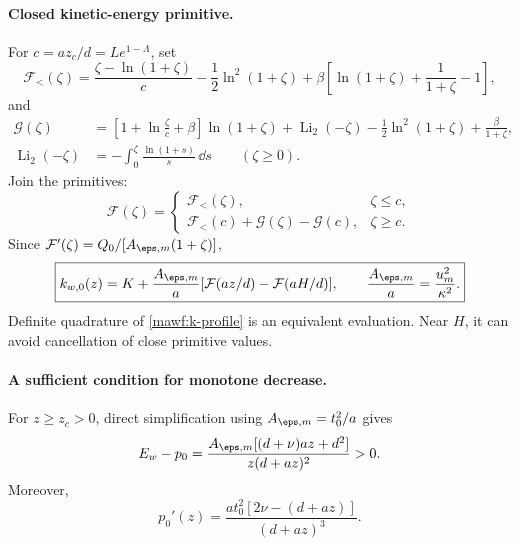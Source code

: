 \paragraph{Closed kinetic-energy primitive.}
For \(c=az_c/d=L e^{1-\Lambda}\), set
\begin{equation}
 \mathcal F_<(\zeta)=
 \frac{\zeta-\ln(1+\zeta)}c-\frac12\ln^2(1+\zeta)
 +\beta\left[\ln(1+\zeta)+\frac1{1+\zeta}-1\right],
\end{equation}
and
\begin{equation}
 \begin{split}
 \mathcal G(\zeta)
 &=\left[1+\ln\frac{\zeta}{c}+\beta\right]\ln(1+\zeta)
   +\operatorname{Li}_2(-\zeta)
   -\frac12\ln^2(1+\zeta)+\frac{\beta}{1+\zeta},\\
 \operatorname{Li}_2(-\zeta)
 &=-\int_0^\zeta\frac{\ln(1+s)}s\,\dd s\qquad(\zeta\ge0).
 \end{split}
\end{equation}
Join the primitives:
\begin{equation}
 \mathcal F(\zeta)=
 \begin{cases}
 \mathcal F_<(\zeta),&\zeta\le c,\\
 \mathcal F_<(c)+\mathcal G(\zeta)-\mathcal G(c),&\zeta\ge c.
 \end{cases}
\end{equation}
Since
\(\mathcal F'(\zeta)=Q_0/[A_{\eps,m}(1+\zeta)]\),
\begin{equation}
 \boxed{k_{w,0}(z)=K+\frac{A_{\eps,m}}a
  [\mathcal F(az/d)-\mathcal F(aH/d)],\qquad
  \frac{A_{\eps,m}}a=\frac{u_m^2}{\kappa^2}.}
 \label{mawf:k-closed}
\end{equation}
Definite quadrature of \cref{mawf:k-profile} is an equivalent
evaluation. Near \(H\), it can avoid cancellation of close
primitive values.

\paragraph{A sufficient condition for monotone decrease.}
For \(z\ge z_c>0\), direct simplification using
\(A_{\eps,m}=t_0^2/a\) gives
\begin{equation}
 E_w-p_0
 =\frac{A_{\eps,m}[(d+\nu)az+d^2]}{z(d+az)^2}>0.
 \label{mawf:tail-defect}
\end{equation}
Moreover,
\begin{equation}
 p_0'(z)=\frac{a t_0^2[2\nu-(d+az)]}{(d+az)^3}.
 \label{mawf:production-derivative}
\end{equation}

